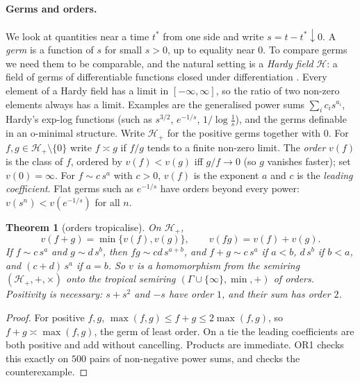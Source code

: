 \documentclass[11pt]{article}
\newtheorem{theorem}{Theorem}\newtheorem{proposition}[theorem]{Proposition}\newtheorem{lemma}[theorem]{Lemma}\newtheorem{corollary}[theorem]{Corollary}\newtheorem{conjecture}[theorem]{Conjecture}
\theoremstyle{definition}\newtheorem{definition}[theorem]{Definition}\newtheorem{remark}[theorem]{Remark}\newtheorem{example}[theorem]{Example}
\begin{document}
\paragraph{Germs and orders.} We look at quantities near a time $t^*$ from one side and write $s=t-t^*\downarrow0$. A \emph{germ} is a
function of $s$ for small $s>0$, up to equality near $0$. To compare germs we need them to be comparable, and the natural setting is a
\emph{Hardy field} $\mathcal H$: a field of germs of differentiable functions closed under differentiation \cite{Hardy1910,Rosenlicht1983}. Every
element of a Hardy field has a limit in $[-\infty,\infty]$, so the ratio of two non-zero elements always has a limit. Examples are the
generalised power sums $\sum_ic_is^{a_i}$, Hardy's exp-log functions (such as $s^{3/2}$, $e^{-1/s}$, $1/\log\tfrac1s$), and the germs definable in an
o-minimal structure. Write $\mathcal H_+$ for the positive germs together with $0$. For $f,g\in\mathcal H_+\setminus\{0\}$ write $f\asymp g$ if $f/g$
tends to a finite non-zero limit. The \emph{order} $v(f)$ is the class of $f$, ordered by $v(f)<v(g)$ iff $g/f\to0$ (so $g$ vanishes faster);
set $v(0)=\infty$. For $f\sim c\,s^a$ with $c>0$, $v(f)$ is the exponent $a$ and $c$ is the \emph{leading coefficient}. Flat germs such as
$e^{-1/s}$ have orders beyond every power: $v(s^n)<v(e^{-1/s})$ for all $n$.

\begin{theorem}[orders tropicalise]\label{thm:tropical}
On $\mathcal H_+$,
\[
v(f+g)=\min\{v(f),v(g)\},\qquad v(fg)=v(f)+v(g).
\]
If $f\sim c\,s^a$ and $g\sim d\,s^b$, then $fg\sim cd\,s^{a+b}$, and $f+g\sim c\,s^a$ if $a<b$, $d\,s^b$ if $b<a$, and $(c+d)\,s^a$ if $a=b$. So
$v$ is a homomorphism from the semiring $(\mathcal H_+,+,\times)$ onto the tropical semiring $(\Gamma\cup\{\infty\},\min,+)$ of orders. Positivity is
necessary: $s+s^2$ and $-s$ have order $1$, and their sum has order $2$.
\end{theorem}

\begin{proof}
For positive $f,g$, $\max(f,g)\le f+g\le2\max(f,g)$, so $f+g\asymp\max(f,g)$, the germ of least order. On a tie the leading coefficients are both
positive and add without cancelling. Products are immediate. OR1 checks this exactly on $500$ pairs of non-negative power sums, and checks
the counterexample.
\end{proof}
\end{document}
